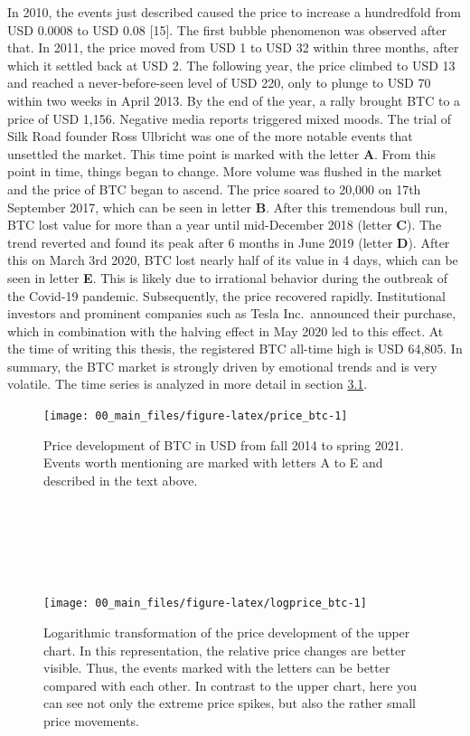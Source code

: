 \documentclass[
]{article}
\begin{document}
In 2010, the events just described caused the price to increase a
hundredfold from USD 0.0008 to USD 0.08 {[}15{]}. The first bubble
phenomenon was observed after that. In 2011, the price moved from USD 1
to USD 32 within three months, after which it settled back at USD 2. The
following year, the price climbed to USD 13 and reached a
never-before-seen level of USD 220, only to plunge to USD 70 within two
weeks in April 2013. By the end of the year, a rally brought BTC to a
price of USD 1,156. Negative media reports triggered mixed moods. The
trial of Silk Road founder Ross Ulbricht was one of the more notable
events that unsettled the market. This time point is marked with the
letter \textbf{A}. From this point in time, things began to change. More
volume was flushed in the market and the price of BTC began to ascend.
The price soared to 20,000 on 17th September 2017, which can be seen in
letter \textbf{B}. After this tremendous bull run, BTC lost value for
more than a year until mid-December 2018 (letter \textbf{C}). The trend
reverted and found its peak after 6 months in June 2019 (letter
\textbf{D}). After this on March 3rd 2020, BTC lost nearly half of its
value in 4 days, which can be seen in letter \textbf{E}. This is likely
due to irrational behavior during the outbreak of the Covid-19 pandemic.
Subsequently, the price recovered rapidly. Institutional investors and
prominent companies such as Tesla Inc.~announced their purchase, which
in combination with the halving effect in May 2020 led to this effect.
At the time of writing this thesis, the registered BTC all-time high is
USD 64,805. In summary, the BTC market is strongly driven by emotional
trends and is very volatile. The time series is analyzed in more detail
in section \protect\hyperlink{data_exploration}{3.1}.

\newpage

\begin{figure}

{\centering \texttt{[image: 00\_main\_files/figure-latex/price\_btc-1]} 

}

\caption{Price development of BTC in USD from fall 2014 to spring 2021. Events worth mentioning are marked with letters A to E and described in the text above.}\label{fig:price_btc}
\end{figure}

~

~

~

\begin{figure}

{\centering \texttt{[image: 00\_main\_files/figure-latex/logprice\_btc-1]} 

}

\caption{Logarithmic transformation of the price development of the upper chart. In this representation, the relative price changes are better visible. Thus, the events marked with the letters can be better compared with each other. In contrast to the upper chart, here you can see not only the extreme price spikes, but also the rather small price movements.}\label{fig:logprice_btc}
\end{figure}
\end{document}
